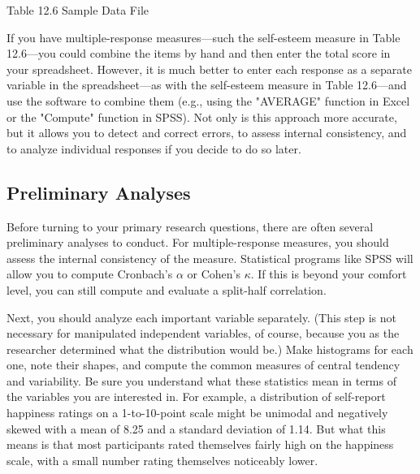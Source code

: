 Table 12.6 Sample Data File


If you have multiple-response measures---such the self-esteem measure in Table 12.6---you could combine the items by hand and then enter the total score in your spreadsheet. However, it is much better to enter each response as a separate variable in the spreadsheet---as with the self-esteem measure in Table 12.6---and use the software to combine them (e.g., using the "AVERAGE" function in Excel or the "Compute" function in SPSS). Not only is this approach more accurate, but it allows you to detect and correct errors, to assess internal consistency, and to analyze individual responses if you decide to do so later.



\subsection{Preliminary Analyses}

Before turning to your primary research questions, there are often several preliminary analyses to conduct. For multiple-response measures, you should assess the internal consistency of the measure. Statistical programs like SPSS will allow you to compute Cronbach's $\alpha$ or Cohen's $\kappa$. If this is beyond your comfort level, you can still compute and evaluate a split-half correlation.


Next, you should analyze each important variable separately. (This step is not necessary for manipulated independent variables, of course, because you as the researcher determined what the distribution would be.) Make histograms for each one, note their shapes, and compute the common measures of central tendency and variability. Be sure you understand what these statistics mean in terms of the variables you are interested in. For example, a distribution of self-report happiness ratings on a 1-to-10-point scale might be unimodal and negatively skewed with a mean of 8.25 and a standard deviation of 1.14. But what this means is that most participants rated themselves fairly high on the happiness scale, with a small number rating themselves noticeably lower.


